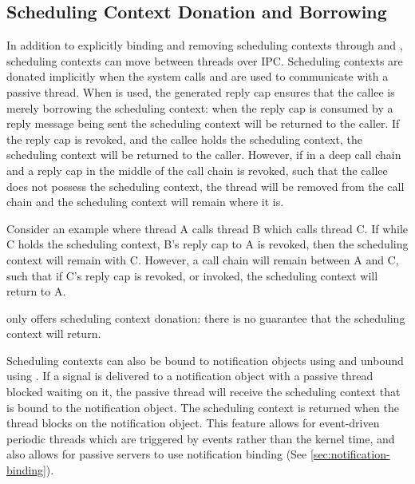 \subsection{Scheduling Context Donation and Borrowing}

In addition to explicitly binding and removing scheduling contexts through  and , scheduling contexts can move between threads over IPC.
Scheduling contexts are donated implicitly when the system calls  and  are used to communicate with a passive thread.
When  is used, the generated reply cap ensures that the callee is merely borrowing the scheduling context: when the reply cap is consumed by a reply message being sent the scheduling context will be returned to the caller.
If the reply cap is revoked, and the callee holds the scheduling context, the scheduling context will be returned to the caller. 
However, if in a deep call chain and a reply cap in the middle of the call chain is revoked, such that the callee does not possess the scheduling context, the thread will be removed from the call chain and the scheduling context will remain where it is. 

Consider an example where thread A calls thread B which calls thread C. 
If while C holds the scheduling context, B's reply cap to A is revoked, then the scheduling context will remain with C. 
However, a call chain will remain between A and C, such that if C's reply cap is revoked, or invoked, the scheduling context will return to A.

 only offers scheduling context donation: there is no guarantee that the scheduling context will return.

Scheduling contexts can also be bound to notification objects using  and unbound using .
If a signal is delivered to a notification object with a passive thread blocked waiting on it, the passive thread will receive the scheduling context that is bound to the notification object.
The scheduling context is returned when the thread blocks on the notification object. 
This feature allows for event-driven periodic threads which are triggered by events rather than the kernel time, and also allows for passive servers to use notification binding (See \autoref{sec:notification-binding}).

